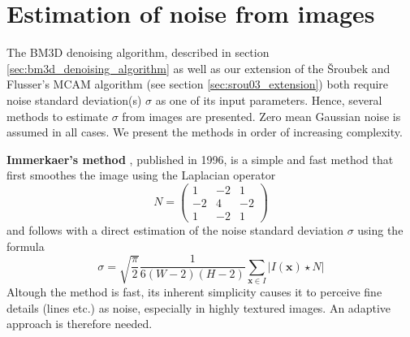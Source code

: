 \documentclass[12pt,notitlepage]{report}
\begin{document}
\section{Estimation of noise from images}
\label{sec:estimation_of_noise_from_images}

The BM3D denoising algorithm, described in section \ref{sec:bm3d_denoising_algorithm} as well as our extension of the Šroubek and Flusser's MCAM algorithm (see section \ref{sec:srou03_extension}) both require noise standard deviation(s) $\sigma$ as one of its input parameters. Hence, several methods to estimate $\sigma$ from images are presented. Zero mean Gaussian noise is assumed in all cases. We present the methods in order of increasing complexity. 

\noindent \textbf{Immerkaer's method} \cite{imm96}, published in 1996, is a simple and fast method that first smoothes the image using the Laplacian operator
\begin{equation}
\label{eq:imm96_matrix}
	N = 
	\begin{pmatrix}
	 1&-2&1 \\
	-2&4&-2 \\
	 1&-2&1 
	\end{pmatrix} 
\end{equation}
and follows with a direct estimation of the noise standard deviation $\sigma$ using the formula
\begin{equation}
\label{eq:imm96_sigma}
	\sigma = \sqrt{\frac{\pi}{2}} \frac{1}{6(W-2)(H-2)}\sum_{\mathbf{x} \in I}^{}\left|I(\mathbf{x}) \star N \right|  
\end{equation}
Altough the method is fast, its inherent simplicity causes it to perceive fine details (lines etc.) as noise, especially in highly textured images. An adaptive approach is therefore needed. 
\end{document}
